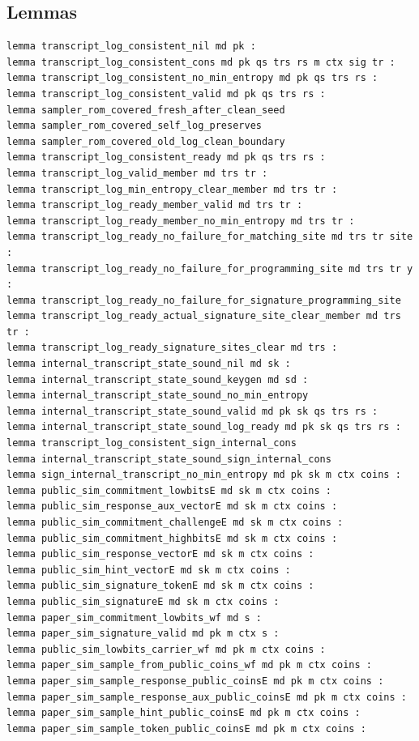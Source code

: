 \subsection*{Lemmas}
\begin{lstlisting}[language=EasyCrypt,basicstyle=\ttfamily\tiny]
lemma transcript_log_consistent_nil md pk :
lemma transcript_log_consistent_cons md pk qs trs rs m ctx sig tr :
lemma transcript_log_consistent_no_min_entropy md pk qs trs rs :
lemma transcript_log_consistent_valid md pk qs trs rs :
lemma sampler_rom_covered_fresh_after_clean_seed
lemma sampler_rom_covered_self_log_preserves
lemma sampler_rom_covered_old_log_clean_boundary
lemma transcript_log_consistent_ready md pk qs trs rs :
lemma transcript_log_valid_member md trs tr :
lemma transcript_log_min_entropy_clear_member md trs tr :
lemma transcript_log_ready_member_valid md trs tr :
lemma transcript_log_ready_member_no_min_entropy md trs tr :
lemma transcript_log_ready_no_failure_for_matching_site md trs tr site :
lemma transcript_log_ready_no_failure_for_programming_site md trs tr y :
lemma transcript_log_ready_no_failure_for_signature_programming_site
lemma transcript_log_ready_actual_signature_site_clear_member md trs tr :
lemma transcript_log_ready_signature_sites_clear md trs :
lemma internal_transcript_state_sound_nil md sk :
lemma internal_transcript_state_sound_keygen md sd :
lemma internal_transcript_state_sound_no_min_entropy
lemma internal_transcript_state_sound_valid md pk sk qs trs rs :
lemma internal_transcript_state_sound_log_ready md pk sk qs trs rs :
lemma transcript_log_consistent_sign_internal_cons
lemma internal_transcript_state_sound_sign_internal_cons
lemma sign_internal_transcript_no_min_entropy md pk sk m ctx coins :
lemma public_sim_commitment_lowbitsE md sk m ctx coins :
lemma public_sim_response_aux_vectorE md sk m ctx coins :
lemma public_sim_commitment_challengeE md sk m ctx coins :
lemma public_sim_commitment_highbitsE md sk m ctx coins :
lemma public_sim_response_vectorE md sk m ctx coins :
lemma public_sim_hint_vectorE md sk m ctx coins :
lemma public_sim_signature_tokenE md sk m ctx coins :
lemma public_sim_signatureE md sk m ctx coins :
lemma paper_sim_commitment_lowbits_wf md s :
lemma paper_sim_signature_valid md pk m ctx s :
lemma public_sim_lowbits_carrier_wf md pk m ctx coins :
lemma paper_sim_sample_from_public_coins_wf md pk m ctx coins :
lemma paper_sim_sample_response_public_coinsE md pk m ctx coins :
lemma paper_sim_sample_response_aux_public_coinsE md pk m ctx coins :
lemma paper_sim_sample_hint_public_coinsE md pk m ctx coins :
lemma paper_sim_sample_token_public_coinsE md pk m ctx coins :

\end{lstlisting}
